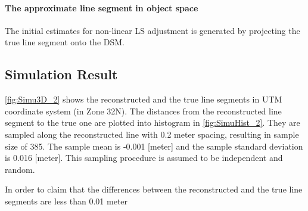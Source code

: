 \paragraph{The approximate line segment in object space}
The initial estimates for non-linear LS adjustment is generated by projecting the true line segment onto the DSM.%

\subsection{Simulation Result}
\label{subsec:simuresult}



\cref{fig:Simu3D_2} shows the reconstructed and the true line segments in UTM coordinate system (in Zone 32N). The distances from the reconstructed line segment to the true one are plotted into histogram in \cref{fig:SimuHist_2}. They are sampled along the reconstructed line with 0.2 meter spacing, resulting in sample size of 385. The sample mean is -0.001 [meter] and the sample standard deviation is 0.016 [meter]. This sampling procedure is assumed to be independent and random.%

In order to claim that the differences between the reconstructed and the true line segments are less than 0.01 meter 


